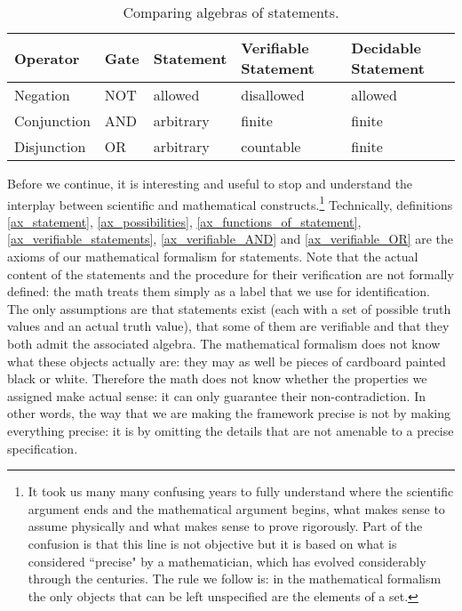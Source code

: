 \documentclass[11pt,letterpaper,fleqn]{memoir} %
\begin{document}
\begin{table}[h]
	\centering
\begin{tabular}{p{} p{} p{} p{} p{}}
	Operator & Gate & Statement & Verifiable Statement & Decidable Statement  \\ 
	\hline 
	Negation & NOT & allowed & disallowed & allowed \\ 
	Conjunction & AND & arbitrary  & finite & finite \\ 
	Disjunction & OR & arbitrary  & countable & finite \\ 
\end{tabular}
	\caption{Comparing algebras of statements.}
\end{table}

Before we continue, it is interesting and useful to stop and understand the interplay between scientific and mathematical constructs.\footnote{It took us many many confusing years to fully understand where the scientific argument ends and the mathematical argument begins, what makes sense to assume physically and what makes sense to prove rigorously. Part of the confusion is that this line is not objective but it is based on what is considered ``precise" by a mathematician, which has evolved considerably through the centuries. The rule we follow is: in the mathematical formalism the only objects that can be left unspecified are the elements of a set.} Technically, definitions \ref{ax_statement}, \ref{ax_possibilities}, \ref{ax_functions_of_statement}, \ref{ax_verifiable_statements}, \ref{ax_verifiable_AND} and \ref{ax_verifiable_OR} are the axioms of our mathematical formalism for statements. Note that the actual content of the statements and the procedure for their verification are not formally defined: the math treats them simply as a label that we use for identification. The only assumptions are that statements exist (each with a set of possible truth values and an actual truth value), that some of them are verifiable and that they both admit the associated algebra. The mathematical formalism does not know what these objects actually are: they may as well be pieces of cardboard painted black or white. Therefore the math does not know whether the properties we assigned make actual sense: it can only guarantee their non-contradiction. In other words, the way that we are making the framework precise is not by making everything precise: it is by omitting the details that are not amenable to a precise specification.
\end{document}
